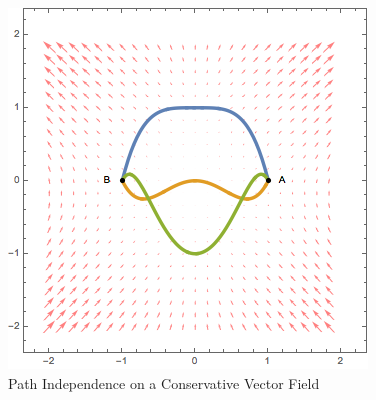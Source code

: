 \documentclass[12pt]{article}
\begin{document}
\begin{figure}[h!]
\centering
\caption{Path Independence on a Conservative Vector Field}
\label{fig:lineintegralexample3}
\indent\includegraphics[scale=0.6]{line_integral_example3.png}
\end{figure}





\end{document}
